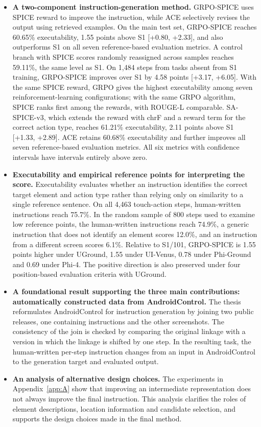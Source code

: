 \begin{itemize}
\item \textbf{A two-component instruction-generation method.} GRPO-SPICE uses SPICE reward to improve the instruction, while ACE selectively revises the output using retrieved examples. On the main test set, GRPO-SPICE reaches 60.65\% executability, 1.55 points above S1 [+0.80, +2.33], and also outperforms S1 on all seven reference-based evaluation metrics. A control branch with SPICE scores randomly reassigned across samples reaches 59.11\%, the same level as S1. On 1,484 steps from tasks absent from S1 training, GRPO-SPICE improves over S1 by 4.58 points [+3.17, +6.05]. With the same SPICE reward, GRPO gives the highest executability among seven reinforcement-learning configurations; with the same GRPO algorithm, SPICE ranks first among the rewards, with ROUGE-L comparable. SA-SPICE-v3, which extends the reward with chrF and a reward term for the correct action type, reaches 61.21\% executability, 2.11 points above S1 [+1.33, +2.89]. ACE retains 60.68\% executability and further improves all seven reference-based evaluation metrics. All six metrics with confidence intervals have intervals entirely above zero.
\item \textbf{Executability and empirical reference points for interpreting the score.} Executability evaluates whether an instruction identifies the correct target element and action type rather than relying only on similarity to a single reference sentence. On all 4,463 touch-action steps, human-written instructions reach 75.7\%. In the random sample of 800 steps used to examine low reference points, the human-written instructions reach 74.9\%, a generic instruction that does not identify an element scores 12.0\%, and an instruction from a different screen scores 6.1\%. Relative to S1/101, GRPO-SPICE is 1.55 points higher under UGround, 1.55 under UI-Venus, 0.78 under Phi-Ground and 0.69 under Phi-4. The positive direction is also preserved under four position-based evaluation criteria with UGround.
\item \textbf{A foundational result supporting the three main contributions: automatically constructed data from AndroidControl.} The thesis reformulates AndroidControl for instruction generation by joining two public releases, one containing instructions and the other screenshots. The consistency of the join is checked by comparing the original linkage with a version in which the linkage is shifted by one step. In the resulting task, the human-written per-step instruction changes from an input in AndroidControl to the generation target and evaluated output.
\item \textbf{An analysis of alternative design choices.} The experiments in Appendix~\ref{app:A} show that improving an intermediate representation does not always improve the final instruction. This analysis clarifies the roles of element descriptions, location information and candidate selection, and supports the design choices made in the final method.
\end{itemize}


